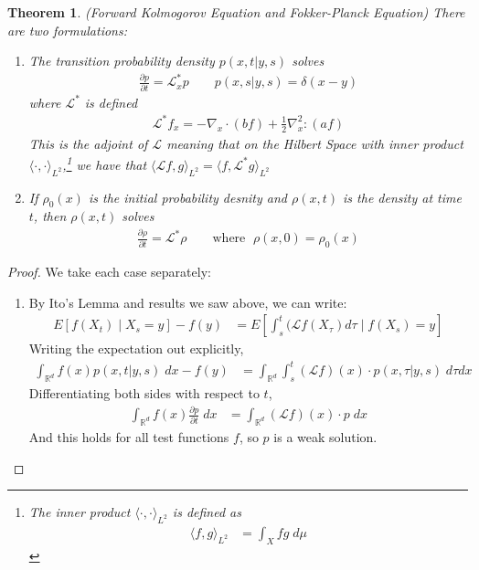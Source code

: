 \documentclass[12pt]{article}
\theoremstyle{plain}
\newtheorem{thm}{Theorem}[section]
\theoremstyle{definition}
\theoremstyle{remark}
\begin{document}
\begin{thm}{(Forward Kolmogorov Equation and Fokker-Planck Equation)}
There are two formulations:
\begin{enumerate}
  \item The transition probability density $p(x,t|y,s)$ solves
    \begin{align*}
      \frac{\partial p}{\partial t} = \mathscr{L}^*_x p
      \qquad p(x,s|y,s) = \delta(x-y)
    \end{align*}
    where $\mathscr{L}^*$ is defined
    \begin{align*}
      \mathscr{L}^*f_x = -\nabla_x \cdot (b f)
      +\frac{1}{2}\nabla^2_x : (a f)
    \end{align*}
    This is the adjoint of $\mathscr{L}$ meaning that
    on the Hilbert Space with inner product
    $\langle\cdot,\cdot\rangle_{L^2}$,\footnote{%
      The inner product $\langle\cdot,\cdot\rangle_{L^2}$ is defined as
      \begin{align*}
        \langle f,g\rangle_{L^2}
        &= \int_X fg\;d\mu
      \end{align*}
    }
    we have that $\langle\mathscr{L}f,g\rangle_{L^2} =\langle
    f,\mathscr{L}^*g\rangle_{L^2}$

  \item If $\rho_0(x)$ is the initial probability desnity and
    $\rho(x,t)$ is the density at time $t$, then $\rho(x,t)$ solves
    \begin{align}
      \frac{\partial \rho}{\partial t} = \mathscr{L}^* \rho
      \qquad \text{where } \; \rho(x,0) = \rho_0(x)
      \label{fpeqn}
    \end{align}
\end{enumerate}
\end{thm}
\begin{proof}
We take each case separately:
\begin{enumerate}
  \item By Ito's Lemma and results we saw above, we can write:
    \begin{align*}
      E[f(X_t) \;|\; X_s=y] -f(y)
      &= E\left[\int^t_s (\mathscr{L}f(X_\tau) d\tau \;\big|\;
          f(X_s)=y\right]
    \end{align*}
    Writing the expectation out explicitly,
    \begin{align*}
      \int_{\mathbb{R}^d} f(x)p(x,t|y,s)\;dx  -f(y)
      &= \int_{\mathbb{R}^d} \int^t_s
        (\mathscr{L}f)(x) \cdot p(x,\tau|y,s)\; d\tau dx
    \end{align*}
    Differentiating both sides with respect to $t$,
    \begin{align*}
      \int_{\mathbb{R}^d} f(x) \frac{\partial p}{\partial t}\;dx
      &= \int_{\mathbb{R}^d}
        (\mathscr{L}f)(x) \cdot p\; dx
    \end{align*}
    And this holds for all test functions $f$, so $p$ is a weak
    solution.
\end{enumerate}
\end{proof}
\end{document}
